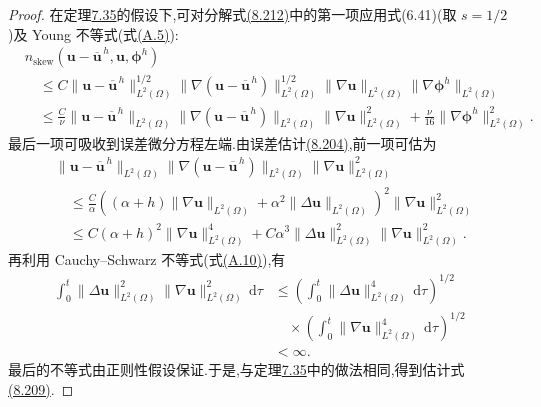 \begin{theorem}
\begin{proof}
在定理\hyperref[thm:time-dependent-fem-velocity-error]{7.35}的假设下,可对分解式\hyperref[eq:leray-alpha-fem-convection-decomposition]{(8.212)}中的第一项应用式(6.41)(取 $s=1/2$)及 Young 不等式(式\hyperref[eq:appendix-a-5]{(A.5)}):
\[
\begin{aligned}
 &n_{\mathrm{skew}}(\bm{u}-\overline{\bm{u}}^{\,h},
                    \bm{u},\symbf{\phi}^h)\\
 &\quad\le C
  \|\bm{u}-\overline{\bm{u}}^{\,h}\|_{L^2(\Omega)}^{1/2}
  \|\nabla(\bm{u}-\overline{\bm{u}}^{\,h})\|_{L^2(\Omega)}^{1/2}
  \|\nabla\bm{u}\|_{L^2(\Omega)}
  \|\nabla\symbf{\phi}^h\|_{L^2(\Omega)}\\
 &\quad\le\frac{C}{\nu}
  \|\bm{u}-\overline{\bm{u}}^{\,h}\|_{L^2(\Omega)}
  \|\nabla(\bm{u}-\overline{\bm{u}}^{\,h})\|_{L^2(\Omega)}
  \|\nabla\bm{u}\|_{L^2(\Omega)}^2
  +\frac{\nu}{16}
   \|\nabla\symbf{\phi}^h\|_{L^2(\Omega)}^2.
\end{aligned}
\]
最后一项可吸收到误差微分方程左端.由误差估计\hyperref[eq:leray-alpha-discrete-filter-L2-error]{(8.204)},前一项可估为
\[
\begin{aligned}
 &\|\bm{u}-\overline{\bm{u}}^{\,h}\|_{L^2(\Omega)}
  \|\nabla(\bm{u}-\overline{\bm{u}}^{\,h})\|_{L^2(\Omega)}
  \|\nabla\bm{u}\|_{L^2(\Omega)}^2\\
 &\quad\le\frac{C}{\alpha}
  \left((\alpha+h)\|\nabla\bm{u}\|_{L^2(\Omega)}
       +\alpha^2\|\Delta\bm{u}\|_{L^2(\Omega)}\right)^2
  \|\nabla\bm{u}\|_{L^2(\Omega)}^2\\
 &\quad\le C(\alpha+h)^2\|\nabla\bm{u}\|_{L^2(\Omega)}^4
       +C\alpha^3\|\Delta\bm{u}\|_{L^2(\Omega)}^2
                    \|\nabla\bm{u}\|_{L^2(\Omega)}^2.
\end{aligned}
\]
再利用 Cauchy--Schwarz 不等式(式\hyperref[eq:appendix-a-10]{(A.10)}),有
\begin{equation}\label{eq:leray-alpha-fem-error-Laplacian-integrability}
 \begin{aligned}
 \int_0^t\|\Delta\bm{u}\|_{L^2(\Omega)}^2
              \|\nabla\bm{u}\|_{L^2(\Omega)}^2\,\mathrm{d}\tau
 &\le
 \left(\int_0^t\|\Delta\bm{u}\|_{L^2(\Omega)}^4\,\mathrm{d}\tau\right)^{1/2}\\
 &\quad\times
 \left(\int_0^t\|\nabla\bm{u}\|_{L^2(\Omega)}^4\,\mathrm{d}\tau\right)^{1/2}\\
 &<\infty.
 \end{aligned}
\end{equation}
最后的不等式由正则性假设保证.于是,与定理\hyperref[thm:time-dependent-fem-velocity-error]{7.35}中的做法相同,得到估计式\hyperref[eq:leray-alpha-fem-error-estimate-weak-regularity]{(8.209)}.


\end{proof}
\end{theorem}
